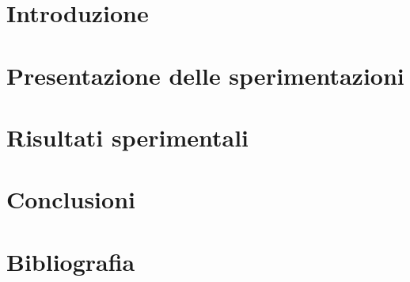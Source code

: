 \documentclass[a4paper,12pt]{book}
\begin{document}
\chapter{Introduzione} %
\label{chapter:primo} %

\clearpage{\pagestyle{plain}\cleardoublepage} %
\chapter{Presentazione delle sperimentazioni} %
\label{chapter:secondo} %

\clearpage{\pagestyle{plain}\cleardoublepage} %
\chapter{Risultati sperimentali} %
\label{chapter:terzo} %

\clearpage{\pagestyle{plain}\cleardoublepage} %
\chapter{Conclusioni} %
\label{chapter:quarto} %

\clearpage{\pagestyle{plain}\cleardoublepage} %
\chapter*{Bibliografia} %
\label{chapter:biblio} %
\printbibliography[heading=none]
\end{document}
